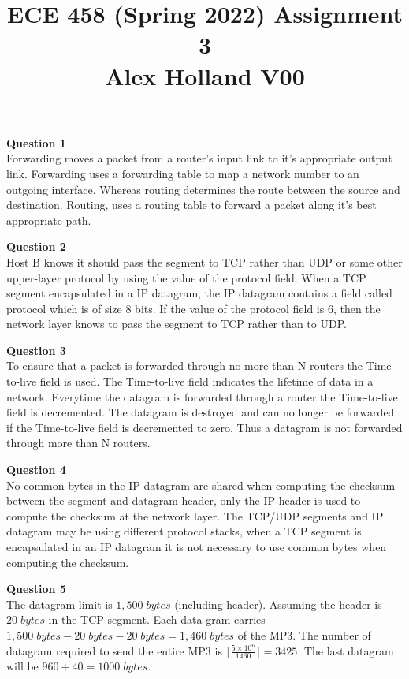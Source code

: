 \documentclass{article}
\title{%
   ECE 458 (Spring 2022) Assignment 3 \\
   \large Alex Holland V00}
\date{}
\begin{document}
\maketitle

{\bf Question 1}\\
Forwarding moves a packet from a router's input link to it's appropriate output link. Forwarding uses a forwarding table to map a network number to an outgoing interface. Whereas routing determines the route between the source and destination. Routing, uses a routing table to forward a packet along it's best appropriate path.

\bigskip
{\bf Question 2}\\
Host B knows it should pass the segment to TCP rather than UDP or some other upper-layer protocol by using the value of the protocol field. When a TCP segment encapsulated in a IP datagram, the IP datagram contains a field called protocol which is of size 8 bits. If the value of the protocol field is 6, then the network layer knows to pass the segment to TCP rather than to UDP.

\bigskip
{\bf Question 3}\\
To ensure that a packet is forwarded through no more than N routers the Time-to-live field is used. The Time-to-live field indicates the lifetime of data in a network. Everytime the datagram is forwarded through a router the Time-to-live field is decremented. The datagram is destroyed and can no longer be forwarded if the Time-to-live field is decremented to zero. Thus a datagram is not forwarded through more than N routers.

\bigskip
{\bf Question 4}\\
No common bytes in the IP datagram are shared when computing the checksum between the segment and datagram header, only the IP header is used to compute the checksum at the network layer. The TCP/UDP segments and IP datagram may be using different protocol stacks, when a TCP segment is encapsulated in an IP datagram it is not necessary to use common bytes when computing the checksum.


\bigskip
{\bf Question 5}\\
The datagram limit is $1,500 \; bytes$ (including header). Assuming the header is $20 \; bytes$ in the TCP segment. Each data gram carries $1,500 \; bytes - 20 \; bytes - 20 \; bytes = 1,460 \; bytes$ of the MP3. The number of datagram required to send the entire MP3 is $\lceil \frac{5\times10^6}{1460} \rceil=3425$. The last datagram will be $960+40=1000 \; bytes$.
\end{document}

